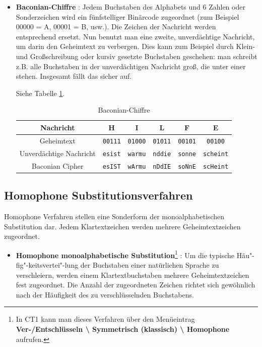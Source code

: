 \begin{refsegment}
\begin{itemize}
\item {\bf Baconian-Chiffre} \cite{ACA2002}:
   Jedem Buchstaben des Alphabets und 6 Zahlen oder Sonderzeichen wird ein
   fünfstelliger Binärcode zugeordnet (zum Beispiel 00000 = A, 00001 = B,
   usw.). Die Zeichen der Nachricht werden entsprechend ersetzt. Nun benutzt
   man eine zweite, unverdächtige Nachricht, um darin den Geheimtext zu
   verbergen. Dies kann zum Beispiel durch Klein- und Großschreibung oder
   kursiv gesetzte Buchstaben geschehen: man schreibt z.B. alle Buchstaben
   in der unverdächtigen Nachricht groß, die unter einer \grqq~
   stehen. Insgesamt fällt das sicher auf.

   Siehe Tabelle \ref{Baconian-table-reference}.

   \begin{table}[ht]
   \begin{center}
   \begin{tabular}{|c|ccccc|}
   \hline
        Nachricht                &  H   &   I   &   L   &   F   &   E     \\
   \hline
	Geheimtext               & {\tt 00111} & {\tt 01000} & {\tt 01011} & {\tt 00101} & {\tt 00100}   \\
	Unverdächtige Nachricht & {\tt esist} & {\tt warmu} & {\tt nddie} & {\tt sonne} & {\tt scheint} \\
   \hline
	Baconian Cipher          & {\tt esIST} & {\tt wArmu} & {\tt nDdIE} & {\tt soNnE} & {\tt scHeint} \\
   \hline
   \end{tabular}
   \caption{Baconian-Chiffre}
   \label{Baconian-table-reference}
   \end{center}
   \end{table}

   \end{itemize}


\subsection{Homophone Substitutionsverfahren}

Homophone Verfahren stellen eine Sonderform der
monoalphabetischen Substitution dar. Jedem Klartextzeichen werden mehrere
Geheimtextzeichen zugeordnet.

\begin{itemize}

\item {\bf Homophone monoalphabetische Substitution}\footnote{In CT1
   kann man dieses Verfahren über den Menüeintrag {\bf Ver-/Entschlüsseln
   \textbackslash{} Symmetrisch (klassisch) \textbackslash{} Homophone}
   aufrufen.}
   \cite{Singh2001}:
   Um die typische Häu"-fig"-keitsvertei"-lung der Buchstaben einer natürlichen
   Sprache zu verschleiern, werden einem Klartextbuchstaben mehrere
   Geheimtextzeichen fest zugeordnet. Die Anzahl der zugeordneten Zeichen
   richtet sich gewöhnlich nach der Häufigkeit des zu verschlüsselnden
   Buchstabens.


\end{itemize}
\end{refsegment}
